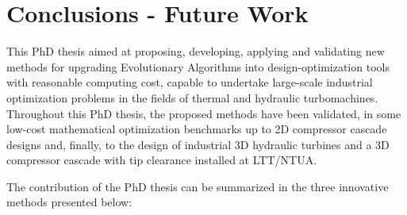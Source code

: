 
\chapter{Conclusions - Future Work} %



\ifpdf
    \graphicspath{{7/figures/PNG/}{7/figures/PDF/}{7/figures/}}
\else
    \graphicspath{{7/figures/EPS/}{7/figures/}}
\fi


This PhD thesis aimed at proposing, developing, applying and validating new methods for upgrading Evolutionary Algorithms into design-optimization tools with reasonable computing cost, capable to undertake large-scale industrial optimization problems in the fields of thermal and hydraulic turbomachines. Throughout this PhD thesis, the proposed methods have been validated, in some low-cost mathematical optimization benchmarks up to 2D compressor cascade designs and, finally, to the design of industrial 3D hydraulic turbines and a 3D compressor cascade with tip clearance installed at LTT/NTUA. 

The contribution of the PhD thesis can be summarized in the three innovative methods presented below:

